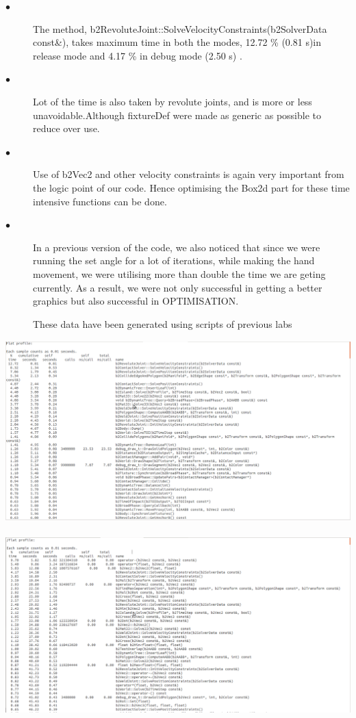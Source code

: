 \documentclass[11pt]{article}
\begin{document}
\begin{description}
\newline
\item[$\bullet$ ]
The method, b2RevoluteJoint::SolveVelocityConstraints(b2SolverData const\&), takes maximum time in both the modes, 12.72 \% (0.81 s)in release mode and 4.17 \% in debug mode (2.50 s) . 
\newline
\item[$\bullet$ ]
Lot of the time is also taken by revolute joints, and is more or less unavoidable.Although fixtureDef were made as generic as possible to reduce over use.
\newline
\item[$\bullet$ ]
Use of b2Vec2 and other velocity constraints is again very important from the logic point of our code. Hence optimising the Box2d part for these time intensive functions can be done.
\newline
\item[$\bullet$ ]
In a previous version of the code, we also noticed that since we were running the set angle for a lot of iterations, while making the hand movement, we were utilising more than double the time we are geting currently. As a result, we were not only successful in getting a better graphics but also successful in OPTIMISATION.
\newline

These data have been generated using scripts of previous labs \cite{pyscript}
\end{description}

\includegraphics[height=7cm]{./images/debug_dat1.png}

\includegraphics[height=7cm]{./images/release_dat1.png}
\end{document}

